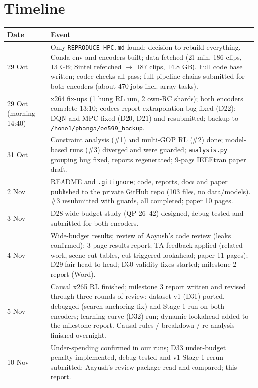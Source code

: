 \documentclass[10pt,a4paper]{article}
\newcommand{\code}[1]{\texttt{\small #1}}
\begin{document}
\section{Timeline}
\begin{longtable}{p{2.3cm}p{14cm}}
\toprule
Date & Event \\\midrule
29 Oct & Only \code{REPRODUCE\_HPC.md} found; decision to rebuild everything. Conda env and encoders built; data
fetched (21 min, 186 clips, 13 GB; Sintel refetched $\to$ 187 clips, 14.8 GB). Full code base written; codec checks all
pass; full pipeline chains submitted for both encoders (about 470 jobs incl. array tasks). \\
29 Oct (morning--14:40) & x264 fix-ups (1 hung RL run, 2 own-RC shards); both encoders complete 13:10; codecs report
extrapolation bug fixed (D22); DQN and MPC fixed (D20, D21) and resubmitted; backup to \code{/home1/pbanga/ee599\_backup}. \\
31 Oct & Constraint analysis (\#1) and multi-GOP RL (\#2) done; model-based runs (\#3) diverged and were guarded;
\code{analysis.py} grouping bug fixed, reports regenerated; 9-page IEEEtran paper draft. \\
2 Nov & README and \code{.gitignore}; code, reports, docs and paper published to the private GitHub repo
(103 files, no data/models). \#3 resubmitted with guards, all completed; paper 10 pages. \\
3 Nov & D28 wide-budget study (QP 26--42) designed, debug-tested and submitted for both encoders. \\
4 Nov & Wide-budget results; review of Aayush's code review (leaks confirmed); 3-page results report; TA feedback
applied (related work, scene-cut tables, cut-triggered lookahead; paper 11 pages); D29 fair head-to-head; D30
validity fixes started; milestone 2 report (Word). \\
5 Nov & Causal x265 RL finished; milestone 3 report written and revised through three rounds of review; dataset v1
(D31) ported, debugged (search anchoring fix) and Stage 1 run on both encoders; learning curve (D32) run;
dynamic lookahead added to the milestone report. Causal rules / breakdown / re-analysis finished overnight. \\
10 Nov & Under-spending confirmed in our runs; D33 under-budget penalty implemented, debug-tested and v1 Stage 1
rerun submitted; Aayush's review package read and compared; this report. \\
\bottomrule
\end{longtable}
\end{document}
